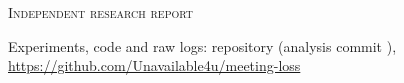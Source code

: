 \begin{titlepage}
\centering
\vspace*{1.2cm}
{\large\scshape Independent research report\par}
\vspace{1.6cm}
{\fontsize{26}{30}\selectfont\bfseries \reporttitle\par}
\vspace{0.7cm}
{\Large \reportsubtitle\par}
\vspace{2.2cm}
{\Large\bfseries \authorone\par}
\vspace{0.5cm}
{\Large\bfseries \authortwo\par}
\vspace{0.7cm}
{\normalsize \authoraffil\par}
\vfill
{\large \reportdate\par}
\vspace{0.6cm}
{\footnotesize Experiments, code and raw logs: repository  (analysis commit \code{\repocommit}),\\\url{https://github.com/Unavailable4u/meeting-loss}\par}
\end{titlepage}
\cleardoublepage
